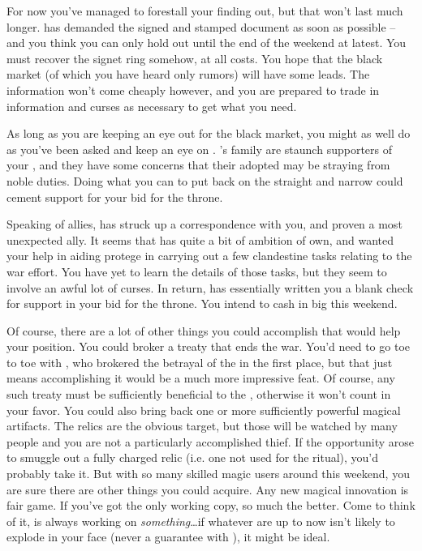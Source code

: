\documentclass[char]{GL2020}
\begin{document}
For now you’ve managed to forestall your \cQueen{\parent} finding out, but that won’t last much longer. \cQueen{\They} has demanded the signed and stamped document as soon as possible -- and you think you can only hold out until the end of the weekend at latest. You must recover the signet ring somehow, at all costs. You hope that the black market (of which you have heard only rumors) will have some leads. The information won’t come cheaply however, and you are prepared to trade in information and curses as necessary to get what you need.

As long as you are keeping an eye out for the black market, you might as well do as you’ve been asked and keep an eye on \cAdopted{}. \cAdopted{}’s family are staunch supporters of your \cQueen{\parent}, and they have some concerns that their adopted \cAdopted{\child} may be straying from \cAdopted{\their} noble duties. Doing what you can to put \cAdopted{\them} back on the straight and narrow could cement \cAdopted{\formal} support for your bid for the throne.

Speaking of allies, \cAntiChup{} has struck up a correspondence with you, and proven a most unexpected ally. It seems that \cAntiChup{} has quite a bit of ambition of \cAntiChup{\their} own, and wanted your help in aiding \cAntiChup{\their} protege in carrying out a few clandestine tasks relating to the war effort. You have yet to learn the details of those tasks, but they seem to involve an awful lot of curses. In return, \cAntiChup{} has essentially written you a blank check for support in your bid for the \pFarm{} throne. You intend to cash in big this weekend.

Of course, there are a lot of other things you could accomplish that would help your position. You could broker a treaty that ends the war. You’d need to go toe to toe with \cDiplomat{}, who brokered the betrayal of the \pShip{} in the first place, but that just means accomplishing it would be a much more impressive feat. Of course, any such treaty must be sufficiently beneficial to the \pFarm{}, otherwise it won’t count in your favor. You could also bring back one or more sufficiently powerful magical artifacts. The relics are the obvious target, but those will be watched by many people and you are not a particularly accomplished thief. If the opportunity arose to smuggle out a fully charged relic (i.e. one not used for the ritual), you’d probably take it. But with so many skilled magic users around this weekend, you are sure there are other things you could acquire. Any new magical innovation is fair game. If you’ve got the only working copy, so much the better. Come to think of it, \cCurse{} is always working on \emph{something}\ldots if whatever \cCurse{\they} are up to now isn’t likely to explode in your face (never a guarantee with \cCurse{}), it might be ideal.
\end{document}
